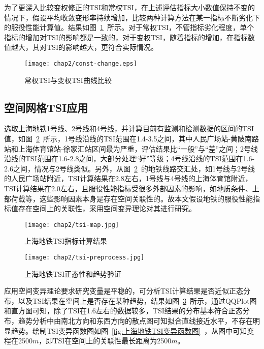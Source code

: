 为了更深入比较变权修正的TSI和常权TSI，在上述评估指标大小数值保持不变的情况下，假设平均收敛变形率持续增加，比较两种计算方法在某一指标不断劣化下的服役性能计算值。结果如图~\ref{fig:常权TSI与变权TSI曲线比较}~所示。对于常权TSI，不管指标劣化程度，单个指标的增加对TSI的影响都是一致的，对于变权TSI，随着指标的增加，在指标数值越大，其对TSI的影响越大，更符合实际情况。

\begin{figure}[htb!]
    \centering
    \texttt{[image: chap2/const-change.eps]}
    \caption{常权TSI与变权TSI曲线比较}
    \label{fig:常权TSI与变权TSI曲线比较}
\end{figure}

\subsection{空间网格TSI应用}

选取上海地铁1号线、2号线和4号线，并计算目前有监测和检测数据的区间的TSI值，如图~\ref{fig:上海地铁TSI指标计算结果}~所示，1号线沿线的TSI范围在1.4-3.5之间，其中人民广场站-黄陂南路站和上海体育馆站-徐家汇站区间最为严重，评估结果比“一般”与“差”之间；2号线沿线的TSI范围在1.6-2.8之间，大部分处理“好”等级；4号线沿线的TSI范围在1.6-2.6之间，情况与2号线类似。另外，从图~\ref{fig:上海地铁TSI指标计算结果}~的地铁线路交汇处，如1号线与2号线的人民广场站附近，TSI计算结果在2.8左右，1号线与4号线的上海体育馆附近，TSI计算结果在2.0左右，且服役性能指标受很多外部因素的影响，如地质条件、上部荷载等，这些影响因素本身是存在空间关联性的。故本文假设地铁的服役性能指标值存在空间上的关联性，采用空间变异理论对其进行研究。

\begin{figure}[htb!]
    \centering
    \texttt{[image: chap2/tsi-map.jpg]}
    \caption{上海地铁TSI指标计算结果}
    \label{fig:上海地铁TSI指标计算结果}
\end{figure}

\begin{figure}[htb!]
    \centering
    \texttt{[image: chap2/tsi-preprocess.jpg]}
    \caption{上海地铁TSI正态性和趋势验证}
    \label{fig:上海地铁TSI正态性和趋势验证}
\end{figure}

应用空间变异理论要求研究变量是平稳的，可分析TSI计算结果是否近似正态分布，以及TSI结果在空间上是否存在某种趋势，结果如图~\ref{fig:上海地铁TSI正态性和趋势验证}~所示，通过QQPlot图和直方图可知，除了TSI在1.6左右的数据较多，TSI结果的分布基本符合正态分布，趋势分析中由南北方向和东西方向的散点图可知拟合直线接近水平，不存在明显趋势。绘制TSI变异函数图如图~\ref{fig:上海地铁TSI变异函数图}~，从图中可知变程在2500$m$，即TSI在空间上的关联性最长距离为2500$m$。

